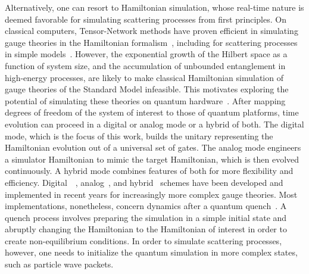 \documentclass[a4paper,onecolumn,11pt,accepted=2024-10-11]{quantumarticle}
\begin{document}
Alternatively, one can resort to Hamiltonian simulation, whose real-time nature is deemed favorable for simulating scattering processes from first principles. On classical computers, Tensor-Network methods have proven efficient in simulating gauge theories in the Hamiltonian formalism~\cite{Banuls:2018jag,Banuls:2019rao,Meurice:2020pxc}, including for scattering processes in simple models~\cite{Pichler:2015yqa,Rigobello:2021fxw,Belyansky:2023rgh,Milsted:2020jmf,Van_Damme_2021}. However, the exponential growth of the Hilbert space as a function of system size, and the accumulation of unbounded entanglement in high-energy processes, are likely to make classical Hamiltonian simulation of gauge theories of the Standard Model infeasible. This motivates exploring the potential of simulating these theories on quantum hardware~\cite{Banuls:2019bmf,Halimeh:2023lid,Klco:2021lap,Bauer:2022hpo,Bauer:2023qgm,DiMeglio:2023nsa}. After mapping degrees of freedom of the system of interest to those of quantum platforms, time evolution can proceed in a digital or analog mode or a hybrid of both. The digital mode, which is the focus of this work, builds the unitary representing the Hamiltonian evolution out of a universal set of gates. The analog mode engineers a simulator Hamiltonian to mimic the target Hamiltonian, which is then evolved continuously. A hybrid mode combines features of both for more flexibility and efficiency. Digital~~\cite{Martinez:2016yna, Klco:2018kyo, Nguyen:2021hyk, Mueller:2022xbg, Chakraborty:2020uhf, deJong:2021wsd, Lamm:2019bik, Shaw:2020udc, Klco:2019evd, Atas:2021ext, Kan:2021xfc, Davoudi:2022xmb, Ciavarella:2021nmj, Atas:2022dqm, Paulson:2020zjd, Haase:2020kaj, Kane:2022ejm, Cohen:2021imf, Murairi:2022zdg, Davoudi:2022uzo, Farrell:2022wyt, Farrell:2022vyh, Charles:2023zbl, Mildenberger:2022jqr, Halimeh:2022pkw,Zhang:2023hzr,Kane:2023jdo, Hariprakash:2023tla},
analog~\cite{Zhou:2021kdl, Yang:2020yer, Mil:2019pbt, Banerjee:2012pg, Zohar:2012ts, Zohar:2012xf, Hauke:2013jga, Wiese:2013uua, Marcos:2013aya, Zohar:2015hwa, Yang:2016hjn, Bender:2018rdp, Davoudi:2019bhy, Luo:2019vmi, Notarnicola:2019wzb, Surace:2019dtp, Surace:2020ycc, Kasper:2020akk, Aidelsburger:2021mia, Andrade:2021pil, Surace:2023qwo},
and hybrid~\cite{Davoudi:2021ney, Gonzalez-Cuadra:2022hxt, Zache:2023cfj, Popov:2023xft, Meth:2023wzd}
schemes have been developed and implemented in recent years for increasingly more complex gauge theories. Most implementations, nonetheless, concern dynamics after a quantum quench~\cite{Mitra_2018}. A quench process involves preparing the simulation in a simple initial state and abruptly changing the Hamiltonian to the Hamiltonian of interest in order to create non-equilibrium conditions. In order to simulate scattering processes, however, one needs to initialize the quantum simulation in more complex states, such as particle wave packets.
\end{document}
